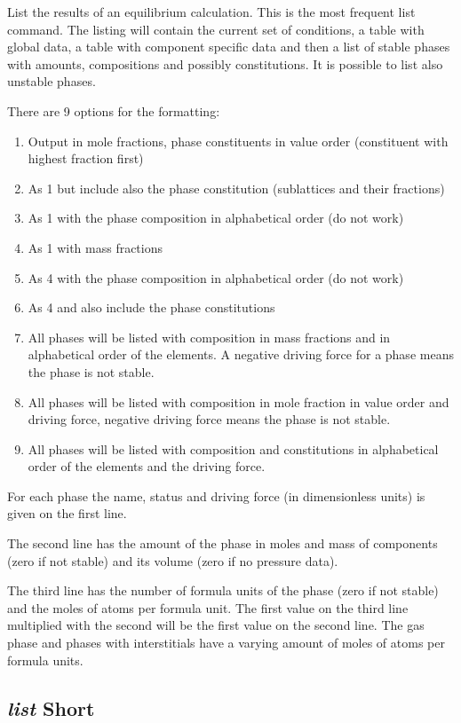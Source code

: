 \documentclass[12pt]{article}
\begin{document}
List the results of an equilibrium calculation.  This is the most
frequent list command.  The listing will contain the current set of
conditions, a table with global data, a table with component specific
data and then a list of stable phases with amounts, compositions and
possibly constitutions.  It is possible to list also unstable phases.

There are 9 options for the formatting:
\begin{enumerate}
\item Output in mole fractions, phase constituents in value order
  (constituent with highest fraction first)
\item As 1 but include also the phase constitution (sublattices and
  their fractions)
\item As 1 with the phase composition in alphabetical order (do not work)
\item As 1 with mass fractions
\item As 4 with the phase composition in alphabetical order (do not work)
\item As 4 and also include the phase constitutions
\item All phases will be listed with composition in mass fractions and
  in alphabetical order of the elements.  A negative driving force for
  a phase means the phase is not stable.
\item All phases will be listed with composition in mole fraction in
  value order and driving force, negative driving force means the
  phase is not stable.
\item All phases will be listed with composition and constitutions in
  alphabetical order of the elements and the driving force.
\end{enumerate}

For each phase the name, status and driving force (in dimensionless
units) is given on the first line.  

The second line has the amount of the phase in moles and mass of
components (zero if not stable) and its volume (zero if no pressure
data).  

The third line has the number of formula units of the phase (zero if
not stable) and the moles of atoms per formula unit.  The first value
on the third line multiplied with the second will be the first value
on the second line.  The gas phase and phases with interstitials have
a varying amount of moles of atoms per formula units.

\subsection{{\em list} Short}
\end{document}
